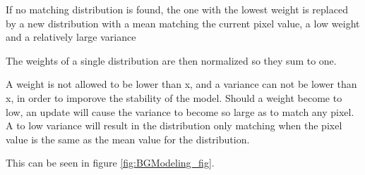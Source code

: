 If no matching distribution is found, the one with the lowest weight is replaced by a new distribution with a mean matching the current pixel value, a low weight and a relatively large variance

The weights of a single distribution are then normalized so they sum to one.

A weight is not allowed to be lower than x, and a variance can not be lower than x, in order to imporove the stability of the model. Should a weight become to low, an update will cause the variance to become so large as to match any pixel. A to low variance will result in the distribution only matching when the pixel value is the same as the mean value for the distribution.

This can be seen in figure \ref{fig:BGModeling_fig}. %
